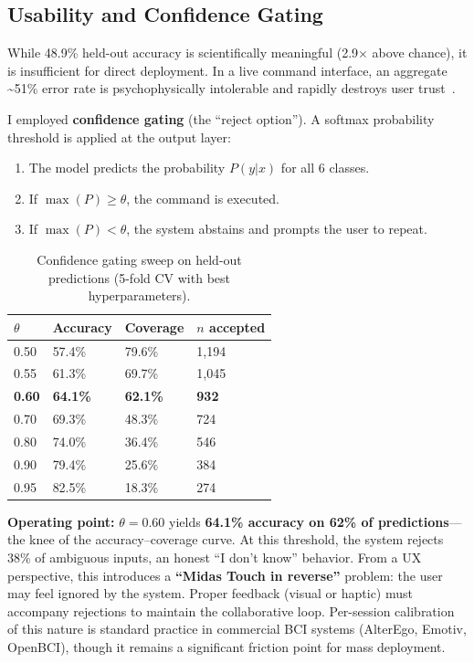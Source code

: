 \documentclass[11pt, a4paper]{article}
\begin{document}
\subsection{Usability and Confidence Gating}

While 48.9\% held-out accuracy is scientifically meaningful (2.9$\times$ above chance), it is insufficient for direct deployment. In a live command interface, an aggregate \textasciitilde51\% error rate is psychophysically intolerable and rapidly destroys user trust~\cite{kapur2018}.

I employed \textbf{confidence gating} (the ``reject option''). A softmax probability threshold is applied at the output layer:

\begin{enumerate}
    \item The model predicts the probability $P(y|x)$ for all 6 classes.
    \item If $\max(P) \geq \theta$, the command is executed.
    \item If $\max(P) < \theta$, the system abstains and prompts the user to repeat.
\end{enumerate}

\begin{table}[h]
\centering
\caption{Confidence gating sweep on held-out predictions (5-fold CV with best hyperparameters).}
\label{tab:confgate}
\begin{tabular}{@{}llll@{}}
\toprule
$\theta$ & Accuracy & Coverage & $n$ accepted \\
\midrule
0.50 & 57.4\% & 79.6\% & 1{,}194 \\
0.55 & 61.3\% & 69.7\% & 1{,}045 \\
\textbf{0.60} & \textbf{64.1\%} & \textbf{62.1\%} & \textbf{932} \\
0.70 & 69.3\% & 48.3\% & 724 \\
0.80 & 74.0\% & 36.4\% & 546 \\
0.90 & 79.4\% & 25.6\% & 384 \\
0.95 & 82.5\% & 18.3\% & 274 \\
\bottomrule
\end{tabular}
\end{table}

\textbf{Operating point:} $\theta = 0.60$ yields \textbf{64.1\% accuracy on 62\% of predictions}---the knee of the accuracy--coverage curve. At this threshold, the system rejects 38\% of ambiguous inputs, an honest ``I don't know'' behavior. From a UX perspective, this introduces a \textbf{``Midas Touch in reverse''} problem: the user may feel ignored by the system. Proper feedback (visual or haptic) must accompany rejections to maintain the collaborative loop. Per-session calibration of this nature is standard practice in commercial BCI systems (AlterEgo, Emotiv, OpenBCI), though it remains a significant friction point for mass deployment.
\end{document}
